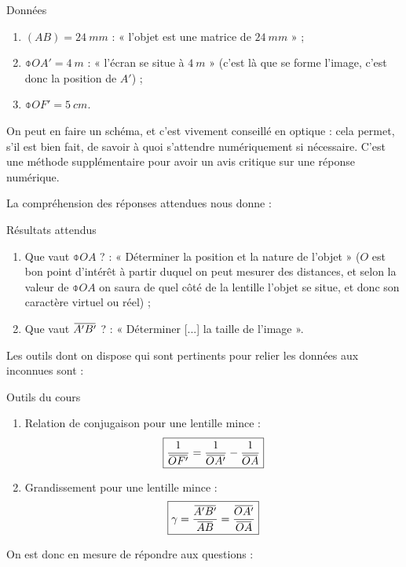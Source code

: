 \documentclass[10pt,a5paper,notitlepage]{book}
\begin{document}
\begin{NCdefi}{Données}
    \begin{enumerate}
        \item $(AB) = \SI{24}{mm}$ : « l'objet est une matrice de $ \SI{24}{mm}$
            » ;
        \item $ \obar{OA'} = \SI{+4}{m}$ : « l'écran se situe à $\SI{4}{m}$ »
            (c'est là que se forme l'image, c'est donc la position de $A'$) ;
        \item $ \obar{OF'} = \SI{+5}{cm}$.
    \end{enumerate}
\end{NCdefi}

On peut en faire un schéma, et c'est vivement conseillé en optique : cela
permet, s'il est bien fait, de savoir à quoi s'attendre numériquement si
nécessaire. C'est une méthode supplémentaire pour avoir un avis critique sur une
réponse numérique. \smallbreak

La compréhension des réponses attendues nous donne :
\begin{NCprop}{Résultats attendus}
    \begin{enumerate}
        \item Que vaut $ \obar{OA}$ ? : « Déterminer la position et la nature de
            l'objet » ($O$ est bon point d'intérêt à partir duquel on peut
            mesurer des distances, et selon la valeur  de
            $\obar{OA}$ on saura de quel côté de la lentille l'objet se situe,
            et donc son caractère virtuel ou réel) ;
        \item Que vaut $\ABp$ ? : « Déterminer [...] la taille de l'image ».
    \end{enumerate}
\end{NCprop}

Les outils dont on dispose qui sont pertinents pour relier les données aux
inconnues sont :
\begin{NCdemo}{Outils du cours}
    \begin{enumerate}
        \item Relation de conjugaison pour une lentille mince :
            \[ \boxed{ \frac{1}{\OF} = \frac{1}{\OAp} - \frac{1}{\OA}}\]
        \item Grandissement pour une lentille mince :
            \[\boxed{\g = \frac{\ABp}{\ABb} = \frac{\OAp}{\OA}}\]
    \end{enumerate}
\end{NCdemo}

On est donc en mesure de répondre aux questions :
\end{document}
